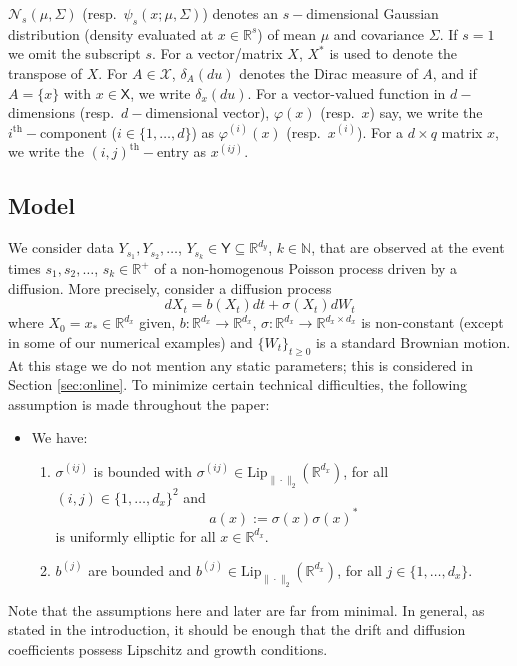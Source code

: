 \documentclass[english]{article}
\newcounter{hypD}
\newenvironment{hypD}{\refstepcounter{hypD}\begin{itemize}
 \item[({\bf D\arabic{hypD}})]}{\end{itemize}}
\begin{document}
$\mathcal{N}_s(\mu,\Sigma)$ (resp.~$\psi_s(x;\mu,\Sigma)$)
denotes an $s-$dimensional Gaussian distribution (density evaluated at $x\in\mathbb{R}^s$) of mean $\mu$ and covariance $\Sigma$. If $s=1$ we omit the subscript $s$. For a vector/matrix $X$, $X^*$ is used to denote the transpose of $X$.
For $A\in\mathcal{X}$, $\delta_A(du)$ denotes the Dirac measure of $A$, and if $A=\{x\}$ with $x\in \mathsf{X}$, we write $\delta_x(du)$. 
For a vector-valued function in $d-$dimensions (resp.~$d-$dimensional vector), $\varphi(x)$ (resp.~$x$) say, we write the $i^{\textrm{th}}-$component ($i\in\{1,\dots,d\}$) as $\varphi^{(i)}(x)$ (resp.~$x^{(i)}$). For a $d\times q$ matrix $x$, we write the $(i,j)^{\textrm{th}}-$entry as $x^{(ij)}$.



\subsection{Model}\label{sec:mod}

We consider data $Y_{s_1},Y_{s_2},\dots$, $Y_{s_k}\in\mathsf{Y}\subseteq\mathbb{R}^{d_y}$, $k\in\mathbb{N}$, that are observed at the event times $s_1,s_2,\dots$, $s_k\in\mathbb{R}^+$ of a non-homogenous Poisson process driven by a diffusion. More precisely, consider a diffusion process
\begin{equation}\label{eq:diff}
dX_t = b(X_t)dt + \sigma(X_t)dW_t
\end{equation}
where $X_0=x_{*}\in\mathbb{R}^{d_x}$ given, $b:\mathbb{R}^{d_x}\rightarrow\mathbb{R}^{d_x}$, $\sigma:\mathbb{R}^{d_x}\rightarrow\mathbb{R}^{d_x\times d_x}$ is non-constant (except in some of our numerical examples) and $\{W_t\}_{t\geq 0}$ is a standard Brownian motion. At this stage we do not mention any static parameters; this is considered in Section \ref{sec:online}.
To minimize certain technical difficulties, the following assumption is made throughout the paper:
\begin{hypD}\label{hyp_diff:1}
We have:
\begin{enumerate}
\item{$\sigma^{(ij)}$ is bounded with $\sigma^{(ij)}\in\textrm{Lip}_{\|\cdot\|_2}(\mathbb{R}^{d_x})$, for all $(i,j)\in\{1,\dots,d_x\}^2$ and 
$$
a(x):=\sigma(x)\sigma(x)^*
$$ 
is uniformly elliptic for all $x\in\mathbb{R}^{d_x}$.}
\item{$b^{(j)}$ are bounded and $b^{(j)}\in\textrm{Lip}_{\|\cdot\|_2}(\mathbb{R}^{d_x})$, for all $j\in\{1,\dots,d_x\}$.}
\end{enumerate}
\end{hypD}
Note that the assumptions here and later are far from minimal. In general, as stated in the introduction, it should be enough that the drift and diffusion coefficients possess Lipschitz and growth conditions.
\end{document}
